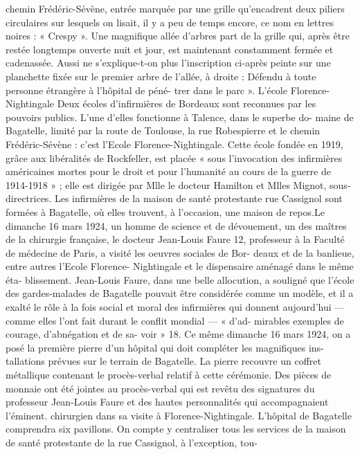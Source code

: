 \documentclass[a4paper,11pt]{book}
\begin{document}
chemin Frédéric-Sévène, entrée marquée par une grille
qu'encadrent deux piliers circulaires sur lesquels on lisait,
il y a peu de temps encore, ce nom en lettres noires :
« Crespy ».
Une magnifique allée d'arbres part de la grille qui,
après être restée longtemps ouverte nuit et jour, est
maintenant constamment fermée et cadenassée. Aussi ne
s'explique-t-on plus l'inscription ci-après peinte sur une
planchette fixée sur le premier arbre de l'allée, à droite :
Défendu à toute personne étrangère à l'hôpital de péné-
trer dans le parc ».
L'école Florence-Nightingale
Deux écoles d'infirmières de Bordeaux sont reconnues
par les pouvoirs publics.
L'une d'elles fonctionne à Talence, dans le superbe do-
maine de Bagatelle, limité par la route de Toulouse, la
rue Robespierre et le chemin Frédéric-Sévène : c'est
l'Ecole Florence-Nightingale.
Cette école fondée en 1919, grâce aux libéralités de
Rockfeller, est placée « sous l'invocation des infirmières
américaines mortes pour le droit et pour l'humanité au
cours de la guerre de 1914-1918 » ; elle est dirigée par
Mlle le docteur Hamilton et Mlles Mignot, sous-directrices.
Les infirmières de la maison de santé protestante rue
Cassignol sont formées à Bagatelle, où elles trouvent, à
l'occasion, une maison de repos.Le dimanche 16 mars 1924, un homme de science et de
dévouement, un des maîtres de la chirurgie française, le
docteur Jean-Louis Faure 12, professeur à la Faculté de
médecine de Paris, a visité les oeuvres sociales de Bor-
deaux et de la banlieue, entre autres l'Ecole Florence-
Nightingale et le dispensaire aménagé dans le même éta-
blissement.
Jean-Louis Faure, dans une belle allocution, a souligné
que l'école des gardes-malades de Bagatelle pouvait être
considérée comme un modèle, et il a exalté le rôle à la
fois social et moral des infirmières qui donnent aujourd'hui
— comme elles l'ont fait durant le conflit mondial — « d'ad-
mirables exemples de courage, d'abnégation et de sa-
voir » 18.
Ce même dimanche 16 mars 1924, on a posé la première
pierre d'un hôpital qui doit compléter les magnifiques ins-
tallations prévues sur le terrain de Bagatelle. La pierre
recouvre un coffret métallique contenant le procès-verbal
relatif à cette cérémonie. Des pièces de monnaie ont été
jointes au procès-verbal qui est revêtu des signatures du
professeur Jean-Louis Faure et des hautes personnalités
qui accompagnaient l'éminent. chirurgien dans sa visite
à Florence-Nightingale.
L'hôpital de Bagatelle comprendra six pavillons. On
compte y centraliser tous les services de la maison de
santé protestante de la rue Cassignol, à l'exception, tou-
\end{document}
